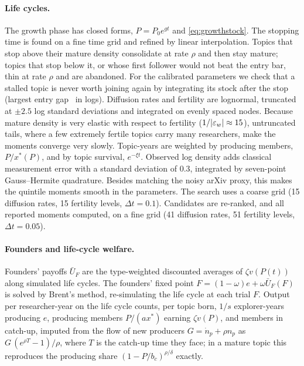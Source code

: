 \paragraph{Life cycles.} The growth phase has closed forms,
$P=P_0e^{gt}$ and \eqref{eq:growthstock}. The stopping time is found on a fine
time grid and refined by linear interpolation. Topics that stop above their
mature density consolidate at rate $\rho$ and then stay mature; topics that
stop below it, or whose first follower would not beat the entry bar, thin at
rate $\rho$ and are abandoned. For the calibrated parameters we check that a
stalled topic is never worth joining again by integrating its stock after the
stop (largest entry gap \calStallGap\ in logs). Diffusion rates and fertility
are lognormal, truncated at $\pm2.5$ log standard deviations and integrated on
evenly spaced nodes. Because mature density is very elastic with respect to
fertility ($1/|\varepsilon_w|\approx15$), untruncated tails, where a few
extremely fertile topics carry many researchers, make the moments converge
very slowly. Topic-years are weighted by producing members, $P/x^*(P)$, and by
topic survival, $e^{-\xi t}$. Observed log density adds classical measurement
error with a standard deviation of 0.3, integrated by seven-point
Gauss--Hermite quadrature. Besides matching the noisy arXiv proxy, this makes
the quintile moments smooth in the parameters. The search uses a coarse grid
(15 diffusion rates, 15 fertility levels, $\Delta t=0.1$). Candidates are
re-ranked, and all reported moments computed, on a fine grid (41 diffusion
rates, 51 fertility levels, $\Delta t=0.05$).

\paragraph{Founders and life-cycle welfare.} Founders' payoffs $\bar U_F$ are the
type-weighted discounted averages of $\zeta v(P(t))$ along simulated life
cycles. The founders' fixed point $F=(1-\omega)e+\omega\bar U_F(F)$ is solved by
Brent's method, re-simulating the life cycle at each trial $F$. Output per
researcher-year on the life cycle counts, per topic born, $1/s$ explorer-years
producing $e$, producing members $P/(ax^*)$ earning $\zeta v(P)$, and members
in catch-up, imputed from the flow of new producers $G=\dot n_p+\rho n_p$ as
$G\,(e^{\rho T}-1)/\rho$, where $T$ is the catch-up time they face; in a mature
topic this reproduces the producing share $(1-P/b_c)^{\rho/\delta}$ exactly.

